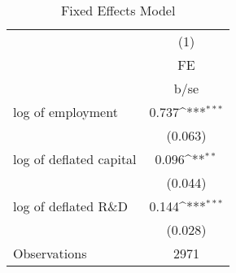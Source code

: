 \begin{table}[htbp]\centering
\def\sym#1{\ifmmode^{#1}\else\(^{#1}\)\fi}
\caption{ Fixed Eﬀects Model}
\begin{tabular}{l*{1}{c}}
\toprule
                    &\multicolumn{1}{c}{(1)}\\
                    &\multicolumn{1}{c}{FE}\\
                    &        b/se         \\
\midrule
log of employment   &       0.737\sym{***}\\
                    &     (0.063)         \\
log of deflated capital&       0.096\sym{**} \\
                    &     (0.044)         \\
log of deflated R\&D &       0.144\sym{***}\\
                    &     (0.028)         \\
\midrule
Observations        &        2971         \\
\bottomrule
\end{tabular}
\end{table}

